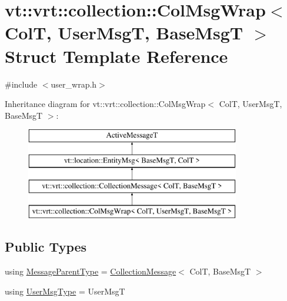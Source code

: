 \hypertarget{structvt_1_1vrt_1_1collection_1_1_col_msg_wrap}{}\section{vt\+:\+:vrt\+:\+:collection\+:\+:Col\+Msg\+Wrap$<$ ColT, User\+MsgT, Base\+MsgT $>$ Struct Template Reference}
\label{structvt_1_1vrt_1_1collection_1_1_col_msg_wrap}


{\ttfamily \#include $<$user\+\_\+wrap.\+h$>$}

Inheritance diagram for vt\+:\+:vrt\+:\+:collection\+:\+:Col\+Msg\+Wrap$<$ ColT, User\+MsgT, Base\+MsgT $>$\+:\begin{figure}[H]
\begin{center}
\leavevmode
\includegraphics[height=4.000000cm]{structvt_1_1vrt_1_1collection_1_1_col_msg_wrap}
\end{center}
\end{figure}
\subsection*{Public Types}
\begin{DoxyCompactItemize}
\item 
using \hyperlink{structvt_1_1vrt_1_1collection_1_1_col_msg_wrap_a51803f5a5355ade7dc2d1a46753ab4e9}{Message\+Parent\+Type} = \hyperlink{structvt_1_1vrt_1_1collection_1_1_collection_message}{Collection\+Message}$<$ ColT, Base\+MsgT $>$
\item 
using \hyperlink{structvt_1_1vrt_1_1collection_1_1_col_msg_wrap_a168446c6b2feea3a003dbfa02f21e227}{User\+Msg\+Type} = User\+MsgT
\end{DoxyCompactItemize}

